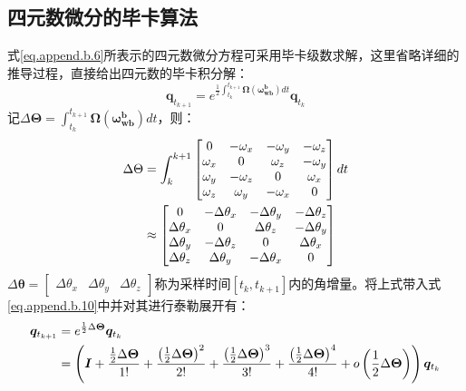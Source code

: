 \subsection{四元数微分的毕卡算法}
式\ref{eq.append.b.6}所表示的四元数微分方程可采用毕卡级数求解，这里省略详细的推导过程，直接给出四元数的毕卡积分解：
\begin{equation}
\bm{q}_{t_{k+1}}=e^{\frac{1}{2}\int_{t_k}^{t_{k+1}}\bm{\Omega}\left(\bm{\omega_{wb}^b}\right)dt}\bm{q}_{t_k}
\label{eq.append.b.10}
\end{equation}
记$\Delta\bm{\Theta}=\int_{t_k}^{t_{k+1}}\bm{\Omega}\left(\bm{\omega_{wb}^b}\right)dt$，则：
\begin{equation}
\centering
\begin{aligned}
\Delta\Theta&=\int_{k}^{k+1}\left[\begin{matrix}
0 & -\omega_x & -\omega_y & -\omega_z \\
\omega_x & 0 & \omega_z & -\omega_y \\
\omega_y & -\omega_z & 0 & \omega_x \\
\omega_z & \omega_y & -\omega_x & 0 
\end{matrix}\right]dt\\
&\approx\left[\begin{matrix}
0 & -\Delta\theta_x & -\Delta\theta_y & -\Delta\theta_z\\
\Delta\theta_x & 0 & \Delta\theta_z & -\Delta\theta_y\\
\Delta\theta_y & -\Delta\theta_z & 0 & \Delta\theta_x\\
\Delta\theta_z & \Delta\theta_y & -\Delta\theta_x & 0
\end{matrix}\right]
\end{aligned}
\end{equation}
$\Delta\bm{\theta}=\left[\begin{array}{ccc}\Delta\theta_x & \Delta\theta_y&\Delta\theta_z\end{array}\right]$称为采样时间$\left[t_k, t_{k+1}\right]$内的角增量。将上式带入式\ref{eq.append.b.10}中并对其进行泰勒展开有：
\begin{equation}
\centering
\begin{aligned}
\bm{q}_{t_{k+1}}&=e^{\frac{1}{2}\Delta\bm{\Theta}}\bm{q}_{t_k}\\
&=\left(\bm{I}+\frac{\frac{1}{2}\Delta\bm{\Theta}}{1!}+\frac{\left(\frac{1}{2}\Delta\bm{\Theta}\right)^2}{2!}+\frac{\left(\frac{1}{2}\Delta\bm{\Theta}\right)^3}{3!}+\frac{\left(\frac{1}{2}\Delta\bm{\Theta}\right)^4}{4!}+o\left(\frac{1}{2}\Delta\bm{\Theta}\right)\right)\bm{q}_{t_k}\\
\end{aligned}
\label{eq.append.b.12}
\end{equation}
